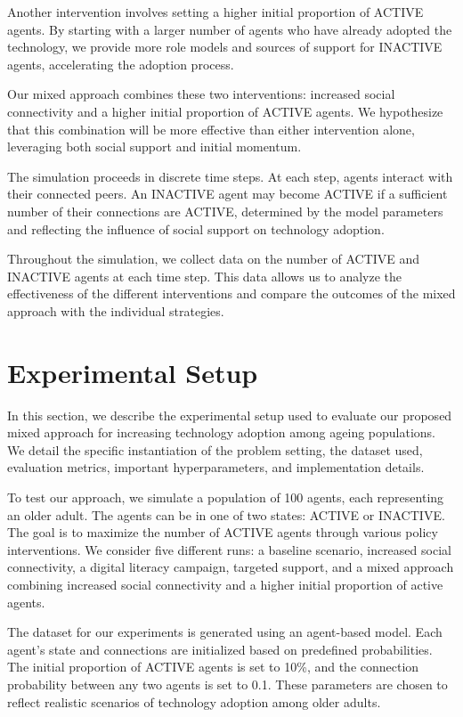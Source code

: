 \documentclass{article} %
\begin{document}
Another intervention involves setting a higher initial proportion of ACTIVE agents. By starting with a larger number of agents who have already adopted the technology, we provide more role models and sources of support for INACTIVE agents, accelerating the adoption process.

Our mixed approach combines these two interventions: increased social connectivity and a higher initial proportion of ACTIVE agents. We hypothesize that this combination will be more effective than either intervention alone, leveraging both social support and initial momentum.

The simulation proceeds in discrete time steps. At each step, agents interact with their connected peers. An INACTIVE agent may become ACTIVE if a sufficient number of their connections are ACTIVE, determined by the model parameters and reflecting the influence of social support on technology adoption.

Throughout the simulation, we collect data on the number of ACTIVE and INACTIVE agents at each time step. This data allows us to analyze the effectiveness of the different interventions and compare the outcomes of the mixed approach with the individual strategies.

\section{Experimental Setup}
\label{sec:experimental}

In this section, we describe the experimental setup used to evaluate our proposed mixed approach for increasing technology adoption among ageing populations. We detail the specific instantiation of the problem setting, the dataset used, evaluation metrics, important hyperparameters, and implementation details.

To test our approach, we simulate a population of 100 agents, each representing an older adult. The agents can be in one of two states: ACTIVE or INACTIVE. The goal is to maximize the number of ACTIVE agents through various policy interventions. We consider five different runs: a baseline scenario, increased social connectivity, a digital literacy campaign, targeted support, and a mixed approach combining increased social connectivity and a higher initial proportion of active agents.

The dataset for our experiments is generated using an agent-based model. Each agent's state and connections are initialized based on predefined probabilities. The initial proportion of ACTIVE agents is set to 10\%, and the connection probability between any two agents is set to 0.1. These parameters are chosen to reflect realistic scenarios of technology adoption among older adults.
\end{document}
